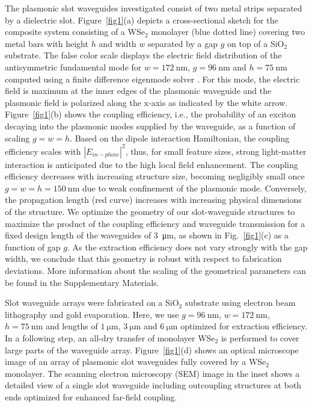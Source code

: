 \documentclass[journal=nalefd,manuscript=letter]{achemso}
\begin{document}
The plasmonic slot waveguides investigated consist of two metal strips separated by a dielectric slot.
Figure~\ref{fig1}(a) depicts a cross-sectional sketch for the composite system consisting of a  WSe$_2$ monolayer (blue dotted line) covering two metal bars with height $h$ and width $w$ separated by a gap $g$ on top of a SiO$_2$ substrate.
The false color scale displays the electric field distribution of the antisymmetric fundamental mode for $w = \SI{172}{\nano\meter}$, $g = \SI{96}{\nano\meter}$ and $h = \SI{75}{\nano\meter}$ computed using a finite difference eigenmode solver \cite{LumericalSolutionsInc..}.
For this mode, the electric field is maximum at the inner edges of the plasmonic waveguide and the plasmonic field is polarized along the x-axis as indicated by the white arrow.
Figure~\ref{fig1}(b) shows the coupling efficiency, i.e., the probability of an exciton decaying into the plasmonic modes supplied by the waveguide, as a function of scaling $g=w=h$.
Based on the dipole interaction Hamiltonian, the coupling efficiency scales with $|E_{in-plane}|^2$, thus, for small feature sizes, strong light-matter interaction is anticipated due to the high local field enhancement.
The coupling efficiency decreases with increasing structure size, becoming negligibly small once $g=w=h=\SI{150}{\nano\meter}$ due to weak confinement of the plasmonic mode.
Conversely, the propagation length (red curve) increases with increasing physical dimensions of the structure.
We optimize the geometry of our slot-waveguide structures to maximize the product of the coupling efficiency and waveguide transmission for a fixed design length of the waveguides of \SI{3}{\micro\meter}, as shown in Fig.~\ref{fig1}(c) as a function of gap $g$.
As the extraction efficiency does not vary strongly with the gap width, we conclude that this geometry is robust with respect to fabrication deviations.
More information about the scaling of the geometrical parameters can be found in the Supplementary Materials.

Slot waveguide arrays were fabricated on a SiO$_2$ substrate using electron beam lithography and gold evaporation.  Here, we use $g = \SI{96}{\nano\meter}$, $w = \SI{172}{\nano\meter}$, $h = \SI{75}{\nano\meter}$ and lengths of $\SI{1}{\micro\meter}$, $\SI{3}{\micro\meter}$ and $\SI{6}{\micro\meter}$ optimized for extraction efficiency.
In a following step, an all-dry transfer of monolayer WSe$_2$ \cite{CastellanosGomez.2014} is performed to cover large parts of the waveguide array.
Figure~\ref{fig1}(d) shows an optical microscope image of an array of plasmonic slot waveguides fully covered by a WSe$_2$ monolayer.
The scanning electron microscopy (SEM) image in the inset shows a detailed view of a single slot waveguide including outcoupling structures at both ends optimized for enhanced far-field coupling.
\end{document}
